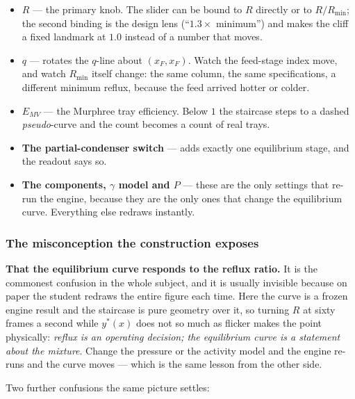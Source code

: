 \documentclass[11pt,a4paper]{article}
\begin{document}
\begin{itemize}[leftmargin=*,nosep]
  \item \textbf{$R$} --- the primary knob.  The slider can be bound to
        $R$ directly or to $R/R_{\min}$; the second binding is the design
        lens (``$1.3\times$ minimum'') and makes the cliff a fixed
        landmark at $1.0$ instead of a number that moves.
  \item \textbf{$q$} --- rotates the $q$-line about $(x_F, x_F)$.  Watch
        the feed-stage index move, and watch $R_{\min}$ itself change:
        the same column, the same specifications, a different minimum
        reflux, because the feed arrived hotter or colder.
  \item \textbf{$E_{MV}$} --- the Murphree tray efficiency.  Below $1$ the
        staircase steps to a dashed \emph{pseudo}-curve and the count
        becomes a count of real trays.
  \item \textbf{The partial-condenser switch} --- adds exactly one
        equilibrium stage, and the readout says so.
  \item \textbf{The components, $\gamma$ model and $P$} --- these are the
        only settings that re-run the engine, because they are the only
        ones that change the equilibrium curve.  Everything else redraws
        instantly.
\end{itemize}

\subsubsection*{The misconception the construction exposes}

\begin{pitfall}
\textbf{That the equilibrium curve responds to the reflux ratio.}  It is
the commonest confusion in the whole subject, and it is usually invisible
because on paper the student redraws the entire figure each time.  Here the
curve is a frozen engine result and the staircase is pure geometry over it,
so turning $R$ at sixty frames a second while $y^{*}(x)$ does not so much
as flicker makes the point physically: \emph{reflux is an operating
decision; the equilibrium curve is a statement about the mixture}.  Change
the pressure or the activity model and the engine re-runs and the curve
moves --- which is the same lesson from the other side.
\end{pitfall}

Two further confusions the same picture settles:
\end{document}
